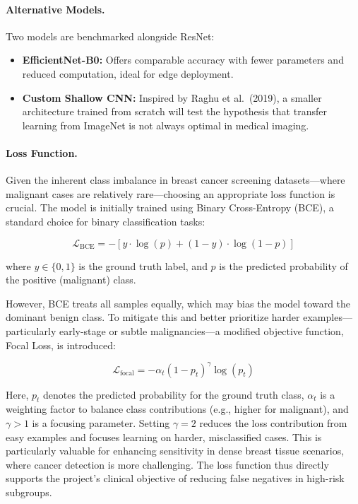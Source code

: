 \documentclass[12pt]{article}
\begin{document}
\paragraph{Alternative Models.}
Two models are benchmarked alongside ResNet:
\begin{itemize}
    \item \textbf{EfficientNet-B0:} Offers comparable accuracy with fewer parameters and reduced computation, ideal for edge deployment.
    \item \textbf{Custom Shallow CNN:} Inspired by Raghu et al.\ (2019), a smaller architecture trained from scratch will test the hypothesis that transfer learning from ImageNet is not always optimal in medical imaging.
\end{itemize}

\paragraph{Loss Function.}
Given the inherent class imbalance in breast cancer screening datasets—where malignant cases are relatively rare—choosing an appropriate loss function is crucial. The model is initially trained using Binary Cross-Entropy (BCE), a standard choice for binary classification tasks:

$$
\mathcal{L}_{\text{BCE}} = -\left[y \cdot \log(p) + (1 - y) \cdot \log(1 - p)\right]
$$

where $y \in \{0, 1\}$ is the ground truth label, and $p$ is the predicted probability of the positive (malignant) class.

However, BCE treats all samples equally, which may bias the model toward the dominant benign class. To mitigate this and better prioritize harder examples—particularly early-stage or subtle malignancies—a modified objective function, Focal Loss, is introduced:

$$
\mathcal{L}_{\text{focal}} = -\alpha_t(1 - p_t)^\gamma \log(p_t)
$$

Here, $p_t$ denotes the predicted probability for the ground truth class, $\alpha_t$ is a weighting factor to balance class contributions (e.g., higher for malignant), and $\gamma > 1$ is a focusing parameter. Setting $\gamma = 2$ reduces the loss contribution from easy examples and focuses learning on harder, misclassified cases. This is particularly valuable for enhancing sensitivity in dense breast tissue scenarios, where cancer detection is more challenging. The loss function thus directly supports the project's clinical objective of reducing false negatives in high-risk subgroups.
\end{document}

